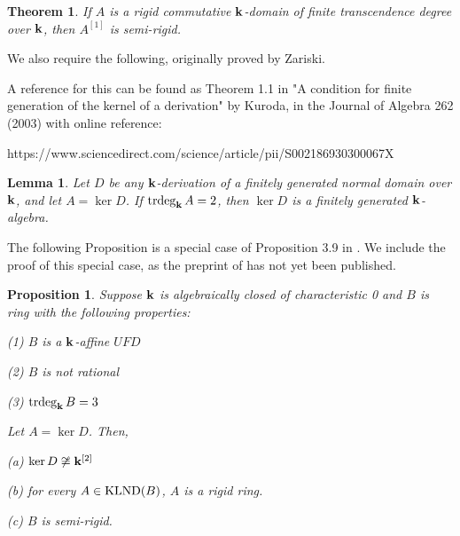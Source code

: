 \documentclass[12pt]{amsart}
\theoremstyle{plain}
\newcommand{\red}{\color{red}}
\newtheorem{theorem}[subsection]{Theorem}
\newtheorem{proposition}[subsection]{Proposition}
\newtheorem{lemma}[subsection]{Lemma}
\theoremstyle{definition}
\newcommand{\trdeg}{	\operatorname{{\rm trdeg}}}
\newcommand{\bk}{{\ensuremath{\rm \bf k}}}
\newcommand{\klnd}{\operatorname{{\rm KLND}}}
\newcommand{\isom}{\cong}
\begin{document}
\begin{theorem} \label{semirigidityTheorem}
	If $A$ is a rigid commutative $\bk$-domain of finite transcendence degree over $\bk$, then $A^{[1]}$ is semi-rigid.
\end{theorem}

We also require the following, originally proved by Zariski. {\red A reference for this can be found as Theorem 1.1 in "A condition for finite generation of the kernel of a derivation" by Kuroda, in the Journal of Algebra 262 (2003) with online reference:

https://www.sciencedirect.com/science/article/pii/S002186930300067X
}

\begin{lemma}\label{fgkerneldim2}
	Let $D$ be any $\bk$-derivation of a finitely generated normal domain over $\bk$, and let $A = \ker D$. If $\trdeg_\bk A = 2$, then $\ker D$ is a finitely generated $\bk$-algebra.  
\end{lemma}

The following Proposition is a special case of Proposition 3.9 in \cite{lndsStructure}. We include the proof of this special case, as the preprint of \cite{lndsStructure} has not yet been published. 

\begin{proposition}\label{trdeg3UFDnotRat}
	Suppose $\bk$ is algebraically closed of characteristic 0 and $B$ is ring with the following properties:
	
	(1) $B$ is a $\bk$-affine $UFD$
	
	(2) $B$ is not rational
	
	(3) $\trdeg_\bk B = 3$
	
	Let $A = \ker D$. Then,
	
	(a) $\ker D \not\isom \bk^{[2]}$
	
	(b) for every $A \in \klnd(B)$, $A$ is a rigid ring.
	
	(c) $B$ is semi-rigid. 
	
\end{proposition}
\end{document}
